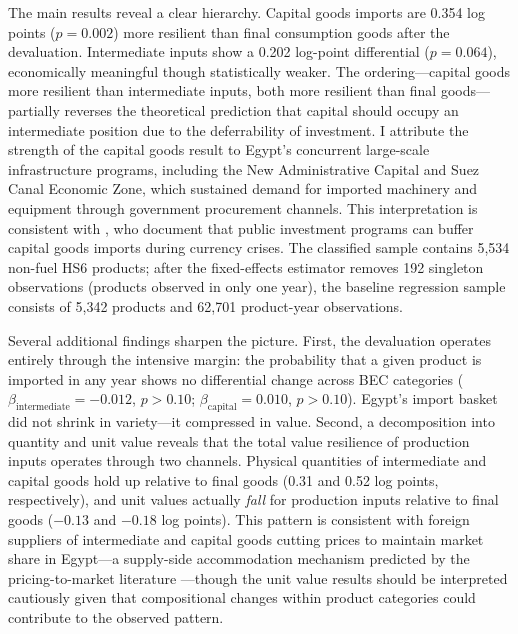 \documentclass[12pt]{article}
\begin{document}
The main results reveal a clear hierarchy. Capital goods imports are 0.354 log points ($p=0.002$) more resilient than final consumption goods after the devaluation. Intermediate inputs show a 0.202 log-point differential ($p=0.064$), economically meaningful though statistically weaker. The ordering---capital goods more resilient than intermediate inputs, both more resilient than final goods---partially reverses the theoretical prediction that capital should occupy an intermediate position due to the deferrability of investment. I attribute the strength of the capital goods result to Egypt's concurrent large-scale infrastructure programs, including the New Administrative Capital and Suez Canal Economic Zone, which sustained demand for imported machinery and equipment through government procurement channels. This interpretation is consistent with \citet{cavallo2005exchange}, who document that public investment programs can buffer capital goods imports during currency crises. The classified sample contains 5,534 non-fuel HS6 products; after the fixed-effects estimator removes 192 singleton observations (products observed in only one year), the baseline regression sample consists of 5,342 products and 62,701 product-year observations.

Several additional findings sharpen the picture. First, the devaluation operates entirely through the intensive margin: the probability that a given product is imported in any year shows no differential change across BEC categories ($\beta_{\text{intermediate}} = -0.012$, $p > 0.10$; $\beta_{\text{capital}} = 0.010$, $p > 0.10$). Egypt's import basket did not shrink in variety---it compressed in value. Second, a decomposition into quantity and unit value reveals that the total value resilience of production inputs operates through two channels. Physical quantities of intermediate and capital goods hold up relative to final goods (0.31 and 0.52 log points, respectively), and unit values actually \textit{fall} for production inputs relative to final goods ($-0.13$ and $-0.18$ log points). This pattern is consistent with foreign suppliers of intermediate and capital goods cutting prices to maintain market share in Egypt---a supply-side accommodation mechanism predicted by the pricing-to-market literature \citep{goldberg1997goods, berman2012how}---though the unit value results should be interpreted cautiously given that compositional changes within product categories could contribute to the observed pattern.
\end{document}
